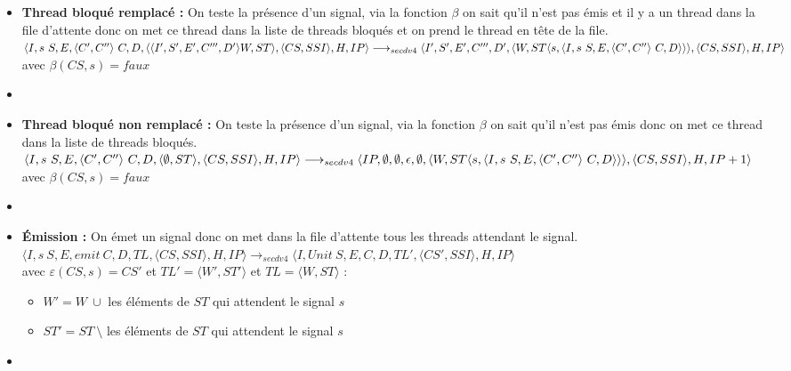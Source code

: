 \documentclass[10pt,a4paper]{report}
\begin{document}
\begin{enumerate}
\begin{itemize}
			
			\item[] \textbf{Thread bloqué remplacé :} On teste la présence d'un signal, via la fonction $\beta$ on sait qu'il n'est pas émis et il y a un thread dans la file d'attente
			donc on met ce thread dans la liste de threads bloqués et on prend le thread en tête de la file.
			\smallbreak
			$\langle I,s~S,E,\langle C',C''\rangle~C,D,\langle\langle I',S',E',C''',D'\rangle W,ST\rangle,\langle CS,SSI\rangle,H,IP\rangle 
			\\\longrightarrow_{secdv4} \langle I',S',E',C''',D',\langle W,ST\langle s,\langle I,s~S,E,\langle C',C''\rangle~C,D\rangle\rangle\rangle,\langle CS,SSI\rangle,H,IP\rangle$ \\
			avec $\beta(CS,s) = faux$
			\item[]	
			
			\item[] \textbf{Thread bloqué non remplacé :} On teste la présence d'un signal, via la fonction $\beta$ on sait qu'il n'est pas émis donc on met ce thread dans la liste de threads bloqués.
			\smallbreak 
			$\langle I,s~S,E,\langle C',C''\rangle~C,D,\langle \emptyset,ST\rangle,\langle CS,SSI\rangle,H,IP\rangle 
			\\\longrightarrow_{secdv4} \langle IP,\emptyset,\emptyset,\epsilon,\emptyset,\langle W,ST\langle s,\langle I,s~S,E,\langle C',C''\rangle~C,D\rangle\rangle\rangle,\langle CS,SSI\rangle,H,IP+1\rangle$ \\
			avec $\beta(CS,s) = faux$
			\item[]	
			\newpage
			
			
			
			\item[] \textbf{Émission :} On émet un signal donc on met dans la file d'attente tous les threads attendant le signal.
			\smallbreak
			$\langle I,s~S,E,emit~C,D,TL,\langle CS,SSI\rangle,H,IP\rangle 
			\longrightarrow_{secdv4} \langle I,Unit~S,E,C,D,TL',\langle CS',SSI\rangle,H,IP\rangle$\\
			avec $\varepsilon(CS,s) = CS'$ et $TL' = \langle W',ST'\rangle$ et $TL = \langle W,ST\rangle$ :
			\begin{itemize}
				\item[] $W' = W~\cup$ les éléments de $ST$ qui attendent le signal $s$ 
				\item[] $ST' = ST~\setminus$ les éléments de $ST$ qui attendent le signal $s$ 
			\end{itemize}
			\item[]
			

\end{itemize}
\end{enumerate}
\end{document}
